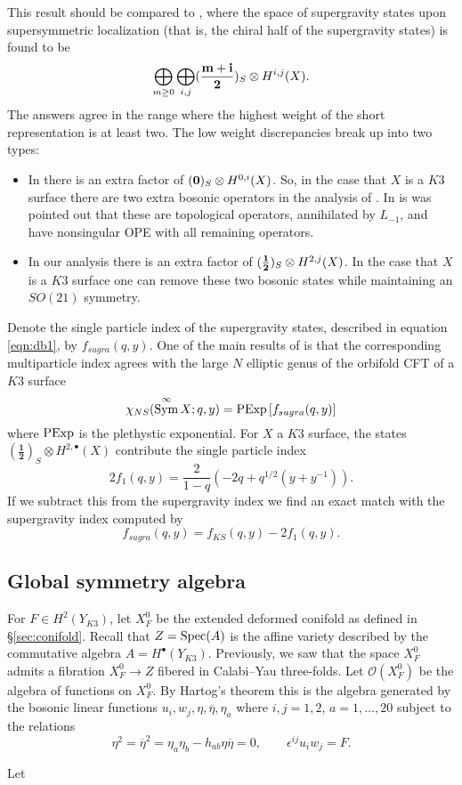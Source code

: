 \documentclass[11pt]{amsart}
\newcommand{\eps}{\epsilon}
\newcommand{\br}{\overline}
\newcommand{\mc}{\mathcal}
\def\eps{{\epsilon}}
\def\bu{{\bullet}}
\def\cO{\mc O}
\DeclareMathOperator{\Sym}{Sym} \DeclareMathOperator{\Hom}{Hom}
\newcommand\beqn{\begin{equation}}
\newcommand\eeqn{\end{equation}}
\theoremstyle{thm}
\numberwithin{equation}{subsection}
\theoremstyle{def}
\theoremstyle{rem}
\begin{document}
This result should be compared to \cite{dB1}, where the space of supergravity states upon supersymmetric localization (that is, the chiral half of the supergravity states) is found to be
\beqn\label{eqn:db1}
\bigoplus_{m \geq 0} \bigoplus_{i,j} (\frac{\bf m+i}{\bf 2})_S \otimes H^{i,j} (X) .
\eeqn
The answers agree in the range where the highest weight of the short representation is at least two. 
The low weight discrepancies break up into two types:
\begin{itemize}
\item In \cite{dB1} there is an extra factor of $({\bf 0})_S \otimes H^{0,i}(X)$. 
So, in the case that $X$ is a $K3$ surface there are two extra bosonic operators in the analysis of \cite{dB1}. 
In \cite{CP} is was pointed out that these are topological operators, annihilated by $L_{-1}$, and have nonsingular OPE with all remaining operators. 
\item 
In our analysis there is an extra factor of $(\frac{\bf 1}{\bf 2})_S \otimes H^{2,j}(X)$. 
In the case that $X$ is a $K3$ surface one can remove these two bosonic states while maintaining an $SO(21)$ symmetry. 
\end{itemize}

Denote the single particle index of the supergravity states, described in equation \eqref{eqn:db1}, by $f_{sugra}(q,y)$. 
One of the main results of \cite{dB1} is that the corresponding multiparticle index agrees with the large $N$ elliptic genus of the orbifold CFT of a $K3$ surface
\beqn
\chi_{NS}(\Sym^\infty X ; q,y) = {\rm PExp} \left[f_{sugra}(q,y) \right]
\eeqn
where ${\rm PExp}$ is the plethystic exponential.
For $X$ a $K3$ surface, the states $(\mathbf{\frac12})_S \otimes H^{2,\bu}(X)$ contribute the single particle index
\beqn
2 f_1 (q,y) = \frac{2}{1-q}\left(-2 q + q^{1/2}(y+y^{-1})\right) .
\eeqn
If we subtract this from the supergravity index we find an exact match with the supergravity index computed by \cite{dB1}
\beqn
f_{sugra}(q,y) = f_{KS}(q,y) - 2 f_1(q,y) .
\eeqn

\subsection{Global symmetry algebra}
For $F \in H^2(Y_{K3})$, let $X^0_F$ be the extended deformed conifold as defined in \S \ref{sec:conifold}.
Recall that $Z = {\rm Spec}(A)$ is the affine variety described by the commutative algebra $A = H^\bu(Y_{K3})$. 
Previously, we saw that the space $X_F^0$ admits a fibration $X^0_F \to Z$ fibered in Calabi--Yau three-folds. 
Let $\cO(X^0_F)$ be the algebra of functions on $X^0_F$.
By Hartog's theorem this is the algebra generated by the bosonic linear functions $u_i, w_j, \eta, \br \eta, \eta_a$ where $i,j=1,2$, $a=1,\ldots, 20$ subject to the relations
\[
\eta^2 = \br \eta^2 = \eta_a \eta_b - h_{ab} \eta \br \eta = 0, \qquad \eps^{ij} u_i w_j = F . 
\]

Let 
\end{document}
